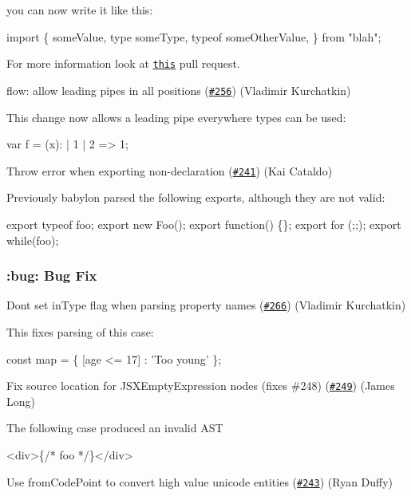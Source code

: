 you can now write it like this\+:


\begin{DoxyCode}
import \{
  someValue,
  type someType,
  typeof someOtherValue,
\} from "blah";
\end{DoxyCode}


For more information look at \href{https://github.com/facebook/flow/pull/2890}{\tt this} pull request.

flow\+: allow leading pipes in all positions (\href{https://github.com/babel/babylon/pull/256}{\tt \#256}) (Vladimir Kurchatkin)

This change now allows a leading pipe everywhere types can be used\+: 
\begin{DoxyCode}
var f = (x): | 1 | 2 => 1;
\end{DoxyCode}


Throw error when exporting non-\/declaration (\href{https://github.com/babel/babylon/pull/241}{\tt \#241}) (Kai Cataldo)

Previously babylon parsed the following exports, although they are not valid\+: 
\begin{DoxyCode}
export typeof foo;
export new Foo();
export function() \{\};
export for (;;);
export while(foo);
\end{DoxyCode}


\subsubsection*{\+:bug\+: Bug Fix}

Don\textquotesingle{}t set in\+Type flag when parsing property names (\href{https://github.com/babel/babylon/pull/266}{\tt \#266}) (Vladimir Kurchatkin)

This fixes parsing of this case\+:


\begin{DoxyCode}
const map = \{
  [age <= 17] : 'Too young'
\};
\end{DoxyCode}


Fix source location for J\+S\+X\+Empty\+Expression nodes (fixes \#248) (\href{https://github.com/babel/babylon/pull/249}{\tt \#249}) (James Long)

The following case produced an invalid A\+ST 
\begin{DoxyCode}
<div>\{/* foo */\}</div>
\end{DoxyCode}


Use from\+Code\+Point to convert high value unicode entities (\href{https://github.com/babel/babylon/pull/243}{\tt \#243}) (Ryan Duffy)

